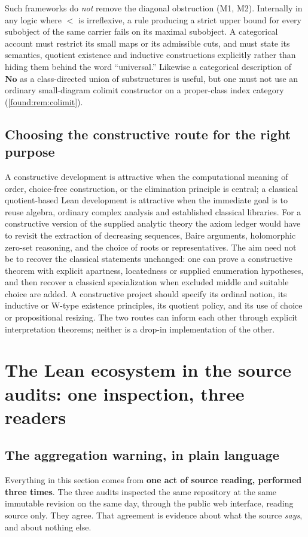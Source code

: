 \documentclass[11pt,letterpaper]{article}
\numberwithin{equation}{section}
\theoremstyle{definition}
\theoremstyle{remark}
\newcommand{\No}{\mathbf{No}}
\begin{document}
Such frameworks do \emph{not} remove the diagonal obstruction (M1, M2).
Internally in any logic where $<$ is irreflexive, a rule producing a strict upper
bound for every subobject of the same carrier fails on its maximal subobject. A
categorical account must restrict its small maps or its admissible cuts, and must
state its semantics, quotient existence and inductive constructions explicitly
rather than hiding them behind the word ``universal.'' Likewise a categorical
description of $\No$ as a class-directed union of substructures is useful, but
one must not use an ordinary small-diagram colimit constructor on a proper-class
index category (\cref{found:rem:colimit}).

\subsection{Choosing the constructive route for the right purpose}
\label{found:sub:constructivepurpose}
A constructive development is attractive when the computational meaning of
order, choice-free construction, or the elimination principle is central; a
classical quotient-based Lean development is attractive when the immediate goal
is to reuse algebra, ordinary complex analysis and established classical
libraries. For a constructive version of the supplied analytic theory the axiom
ledger would have to revisit the extraction of decreasing sequences, Baire
arguments, holomorphic zero-set reasoning, and the choice of roots or
representatives. The aim need not be to recover the classical statements
unchanged: one can prove a constructive theorem with explicit apartness,
locatedness or supplied enumeration hypotheses, and then recover a classical
specialization when excluded middle and suitable choice are added. A constructive
project should specify its ordinal notion, its inductive or W-type existence
principles, its quotient policy, and its use of choice or propositional resizing.
The two routes can inform each other through explicit interpretation theorems;
neither is a drop-in implementation of the other.

\section{The Lean ecosystem in the source audits: one inspection, three readers}
\label{found:sec:ecosystem}

\subsection{The aggregation warning, in plain language}
\label{found:sub:aggregation}
Everything in this section comes from \textbf{one act of source reading,
performed three times}. The three audits inspected the same repository at the
same immutable revision on the same day, through the public web interface,
reading source only. They agree. That agreement is evidence about what the
source \emph{says}, and about nothing else.
\end{document}
